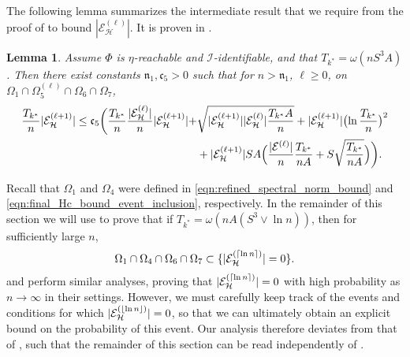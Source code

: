 \documentclass[11pt]{article}
\newcommand{\mf}[1]{\mathfrak{#1}}
\newcommand{\mcE}{\mathcal{E}}
\newcommand{\mcH}{\mathcal{H}}
\newcommand{\mcI}{\mathcal{I}}
\DeclarePairedDelimiter\ceil{\lceil}{\rceil}
\DeclarePairedDelimiter\floor{\lfloor}{\rfloor}
\newtheorem{lemma}[theorem]{Lemma}
\theoremstyle{definition}
\theoremstyle{definition}
\begin{document}
The following lemma summarizes the intermediate result that we require from the proof of \cite[Proposition 21]{Jedra:2022} to bound $|\mcE_{\mcH}^{(\ell)}|$.
It is proven in .
\begin{lemma}
	\label{lem:bound_on_one_step_improvement_error_rate}
	Assume $\Phi$ is $\eta$-reachable and $\mcI$-identifiable, and that $T_{k^*}=\omega(nS^3A)$.
	Then there exist constants $\mf{n}_1,\mf{c}_5>0$ such that for $n>\mf{n}_1$, $\ell\geq 0$, on $\Omega_1\cap\Omega_5^{(\ell)}\cap\Omega_6\cap\Omega_7$,
	\begin{equation}
		\label{eqn:bound_on_one_step_improvement_error_rate}
		\begin{split}
			\frac{T_{k^*}}{n}
			|\mcE_{\mcH}^{(\ell+1)}|
			\leq
			\mf{c}_5
			\biggl(
			\frac{T_{k^*}}{n}
			\frac{|\mcE_{\mcH}^{(\ell)}|}{n}
			|\mcE_{\mcH}^{(\ell+1)}|
			+
			 &
			\sqrt{|\mcE_{\mcH}^{(\ell+1)}||\mcE_{\mcH}^{(\ell)}|\frac{T_{k^*}A}{n}}
			+
			|\mcE_{\mcH}^{(\ell+1)}|\bigl(\ln\frac{T_{k^*}}{n}\bigr)^2
			\\
			 &
			+
			|\mcE_{\mcH}^{(\ell+1)}|SA\Bigl(
			\frac{|\mcE^{(\ell)}|}{n}
			\frac{T_{k^*}}{nA}
			+
			S\sqrt{\frac{T_{k^*}}{nA}}
			\Bigr)
			\biggr)
			.
		\end{split}
	\end{equation}

\end{lemma}

Recall that $\Omega_1$ and $\Omega_4$ were defined in \eqref{eqn:refined_spectral_norm_bound} and \eqref{eqn:final_Hc_bound_event_inclusion}, respectively.
In the remainder of this section we will use  to prove that if $T_{k^*}=\omega(nA(S^3\vee \ln n))$, then for sufficiently large $n$,
\begin{equation}
	\label{eqn:inclusion_vanishing_E_H}
	\Omega_1\cap\Omega_4\cap\Omega_6\cap\Omega_7
	\subset
	\{|\mcE_{\mcH}^{(\ceil{\ln n})}|=0\}
	.
\end{equation}
\cite[Appendix G.2]{Jedra:2022} and \cite{yun2016optimal,Sanders:2020} perform similar analyses, proving that $|\mcE_{\mcH}^{(\ceil{\ln n})}|=0$ with high probability as $n\rightarrow\infty$ in their settings.
However, we must carefully keep track of the events and conditions for which $|\mcE_{\mcH}^{(\floor{\ln n})}|=0$, so that we can ultimately obtain an explicit bound on the probability of this event.
Our analysis therefore deviates from that of \cite{Jedra:2022}, such that the remainder of this section can be read independently of \cite{Jedra:2022}.
\end{document}

